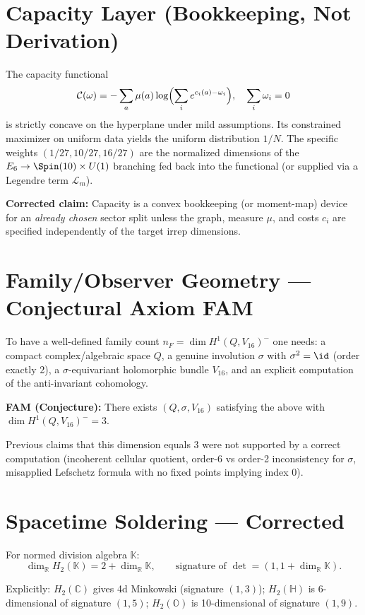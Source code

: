 \documentclass[11pt]{article}
\begin{document}
\section*{Capacity Layer (Bookkeeping, Not Derivation)}

The capacity functional
\[
\mathcal{C}(\omega) = -\sum_a \mu(a) \log\Bigl(\sum_i e^{c_i(a)-\omega_i}\Bigr), \quad \sum_i \omega_i = 0
\]
is strictly concave on the hyperplane under mild assumptions. Its constrained maximizer on uniform data yields the uniform distribution $1/N$. The specific weights $(1/27, 10/27, 16/27)$ are the normalized dimensions of the $E_6 \to \Spin(10)\times U(1)$ branching fed back into the functional (or supplied via a Legendre term $\mathcal{L}_m$). 

\textbf{Corrected claim:} Capacity is a convex bookkeeping (or moment-map) device for an \emph{already chosen} sector split unless the graph, measure $\mu$, and costs $c_i$ are specified independently of the target irrep dimensions.

\section*{Family/Observer Geometry — Conjectural Axiom \textbf{FAM}}

To have a well-defined family count $n_F = \dim H^1(Q, V_{16})^{-}$ one needs: a compact complex/algebraic space $Q$, a genuine involution $\sigma$ with $\sigma^2 = \id$ (order exactly 2), a $\sigma$-equivariant holomorphic bundle $V_{16}$, and an explicit computation of the anti-invariant cohomology.

\textbf{\textbf{FAM} (Conjecture):} There exists $(Q, \sigma, V_{16})$ satisfying the above with $\dim H^1(Q, V_{16})^{-} = 3$.

Previous claims that this dimension equals 3 were not supported by a correct computation (incoherent cellular quotient, order-6 vs order-2 inconsistency for $\sigma$, misapplied Lefschetz formula with no fixed points implying index 0).

\section*{Spacetime Soldering — Corrected}

For normed division algebra $\mathbb{K}$:
\[
\dim_{\mathbb{R}} H_2(\mathbb{K}) = 2 + \dim_{\mathbb{R}} \mathbb{K}, \qquad \text{signature of }\det = (1, 1 + \dim_{\mathbb{R}}\mathbb{K}).
\]

Explicitly: $H_2(\mathbb{C})$ gives 4d Minkowski (signature $(1,3)$); $H_2(\mathbb{H})$ is 6-dimensional of signature $(1,5)$; $H_2(\mathbb{O})$ is 10-dimensional of signature $(1,9)$.
\end{document}
